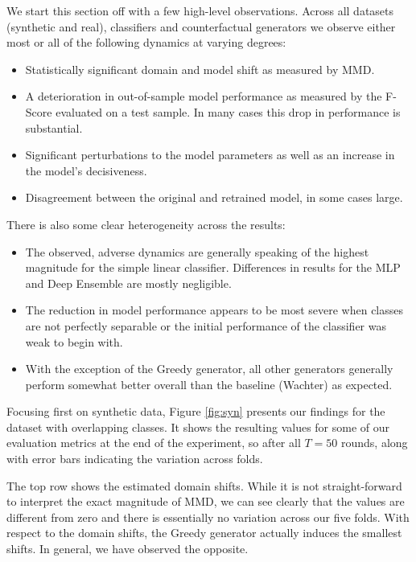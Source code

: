 \documentclass[conference,final,]{IEEEtran}
\providecommand{\tightlist}{%
  \setlength{\itemsep}{0pt}\setlength{\parskip}{0pt}}
\theoremstyle{definition}
\theoremstyle{definition}
\theoremstyle{definition}
\theoremstyle{definition}
\theoremstyle{remark}
\begin{document}
We start this section off with a few high-level observations. Across all datasets (synthetic and real), classifiers and counterfactual generators we observe either most or all of the following dynamics at varying degrees:

\begin{itemize}
\tightlist
\item
  Statistically significant domain and model shift as measured by MMD.
\item
  A deterioration in out-of-sample model performance as measured by the F-Score evaluated on a test sample. In many cases this drop in performance is substantial.
\item
  Significant perturbations to the model parameters as well as an increase in the model's decisiveness.
\item
  Disagreement between the original and retrained model, in some cases large.
\end{itemize}

There is also some clear heterogeneity across the results:

\begin{itemize}
\tightlist
\item
  The observed, adverse dynamics are generally speaking of the highest magnitude for the simple linear classifier. Differences in results for the MLP and Deep Ensemble are mostly negligible.
\item
  The reduction in model performance appears to be most severe when classes are not perfectly separable or the initial performance of the classifier was weak to begin with.
\item
  With the exception of the Greedy generator, all other generators generally perform somewhat better overall than the baseline (Wachter) as expected.
\end{itemize}

Focusing first on synthetic data, Figure \ref{fig:syn} presents our findings for the dataset with overlapping classes. It shows the resulting values for some of our evaluation metrics at the end of the experiment, so after all \(T=50\) rounds, along with error bars indicating the variation across folds.

The top row shows the estimated domain shifts. While it is not straight-forward to interpret the exact magnitude of MMD, we can see clearly that the values are different from zero and there is essentially no variation across our five folds. With respect to the domain shifts, the Greedy generator actually induces the smallest shifts. In general, we have observed the opposite.
\end{document}
